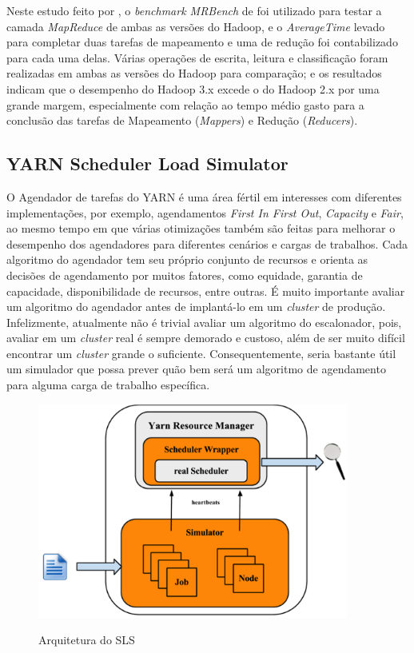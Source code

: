 Neste estudo feito por \cite{masur2017preliminary}, o \emph{benchmark MRBench} de \cite{noll2011benchmarking} foi utilizado para testar a camada \emph{MapReduce} de ambas as versões do Hadoop, e o \emph{AverageTime} levado para completar duas tarefas de mapeamento e uma de redução foi contabilizado para cada uma delas. Várias operações de escrita, leitura e classificação foram realizadas em ambas as versões do Hadoop para comparação; e os resultados indicam que o desempenho do Hadoop 3.x excede o do Hadoop 2.x por uma grande margem, especialmente com relação ao tempo médio gasto para a conclusão das tarefas de Mapeamento (\emph{Mappers}) e Redução (\emph{Reducers}).

\subsection{YARN Scheduler Load Simulator}

O Agendador de tarefas do YARN é uma área fértil em interesses com diferentes implementações, por exemplo, agendamentos \emph{First In First Out}, \emph{Capacity} e \emph{Fair}, ao mesmo tempo em que várias otimizações também são feitas para melhorar o desempenho dos agendadores para diferentes cenários e cargas de trabalhos. Cada algoritmo do agendador tem seu próprio conjunto de recursos e orienta as decisões de agendamento por muitos fatores, como equidade, garantia de capacidade, disponibilidade de recursos, entre outras. É muito importante avaliar um algoritmo do agendador antes de implantá-lo em um \emph{cluster} de produção. Infelizmente, atualmente não é trivial avaliar um algoritmo do escalonador, pois, avaliar em um \emph{cluster} real é sempre demorado e custoso, além de ser muito difícil encontrar um \emph{cluster} grande o suficiente. Consequentemente, seria bastante útil um simulador que possa prever quão bem será um algoritmo de agendamento para alguma carga de trabalho específica.

\begin{figure}[htbp]
    \centering
    \includegraphics[width=10.2cm]{2-fundam/Figura_9.jpg}
    \caption{Arquitetura do SLS}
    \cite{ApacheSLS}
    \label{fig:ApacheSLS}
\end{figure}

